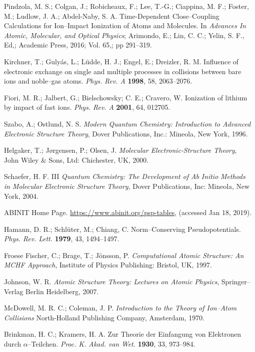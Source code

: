 \documentclass[10pt]{article}
\begin{document}
\begin{thebibliography}{10}
Pindzola, M. S.; Colgan, J.; Robicheaux, F.; Lee, T.-G.; Ciappina, M. F.;
Foster, M.; Ludlow, J. A.; Abdel-Naby,
 S. A.
Time-Dependent Close--Coupling Calculations for Ion--Impact Ionization 
of Atoms and Molecules. 
In {\it Advances In Atomic, Molecular, and Optical Physics};
Arimondo, E.; Lin, C. C.; Yelin,
 S. F., Ed,;
Academic Press,
 2016; Vol. 65,; pp 291--319.

Kirchner, T.; Guly\'as, L.; L\"udde, H. J.; Engel, E.; Dreizler, R. M. 
Influence of electronic exchange on single and multiple processes in 
collisions between bare ions and noble--gas atoms.
{\it Phys. Rev. A} {\bf 1998}, 58, 2063--2076.

Fiori, M. R.; Jalbert, G.; Bielschowsky; C. E.; Cravero, W.
Ionization of lithium by impact of fast ions.
{\it Phys. Rev. A} {\bf 2001}, 64, 012705.

Szabo, A.; Ostlund, N. S.
{\it Modern Quantum Chemistry: Introduction to Advanced Electronic 
Structure Theory},
Dover Publications, Inc.: Mineola, New York, 1996.

Helgaker, T.; J{\o}rgensen, P.; Olsen, J.
{\it Molecular Electronic-Structure Theory},
John Wiley {\&} Sons, Ltd: Chichester, UK, 2000.

Schaefer, H. F. III
{\it Quantum Chemistry: The Development of Ab Initio Methods in
Molecular Electronic Structure Theory},
Dover Publications, Inc: Mineola, New York, 2004.

ABINIT Home Page. 
\url{https://www.abinit.org/psp-tables},
(accessed Jan 18, 2019).

Hamann, D. R.; Schl\"uter, M.; Chiang, C.
Norm--Conserving Pseudopotentials.
{\it Phys. Rev. Lett.} {\bf 1979}, 43, 1494--1497.

Froese Fischer, C.; Brage, T.; J\"onsson, P.
{\it Computational Atomic Structure: An MCHF Approach},
Institute of Physics Publishing: Bristol, UK, 1997.

Johnson, W. R. 
{\it Atomic Structure Theory: Lectures on Atomic Physics},
Springer--Verlag Berlin Heidelberg, 2007.

McDowell, M. R. C.; Coleman, J. P.
{\it Introduction to the Theory of Ion--Atom Collisions}
North-Holland Publishing Company, Amsterdam, 1970.

Brinkman, H. C.; Kramers, H. A.
Zur Theorie der Einfangung von Elektronen durch $\alpha$--Teilchen.
{\it Proc. K. Akad. van Wet.} {\bf 1930}, 33, 973--984.


\end{thebibliography}
\end{document}
